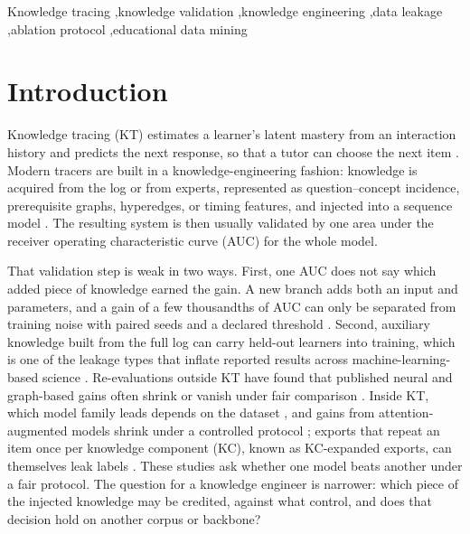 \documentclass[review,12pt]{elsarticle}
\begin{document}
\begin{frontmatter}
\begin{keyword}
Knowledge tracing \sep knowledge validation \sep knowledge engineering
\sep data leakage \sep ablation protocol \sep educational data mining
\end{keyword}

\end{frontmatter}

\section{Introduction}

Knowledge tracing (KT) estimates a learner's latent mastery from an
interaction history and predicts the next response, so that a tutor
can choose the next item \cite{corbett1995bkt}. Modern tracers are built in a
knowledge-engineering fashion: knowledge is acquired from the log or
from experts, represented as question--concept incidence, prerequisite
graphs, hyperedges, or timing features, and injected into a sequence
model \cite{yang2021gikt,nakagawa2019gkt,shen2021lpkt}. The resulting
system is then usually validated by one area under the receiver
operating characteristic curve (AUC) for the whole model.

That validation step is weak in two ways. First, one AUC does not say
which added piece of knowledge earned the gain. A new branch adds both
an input and parameters, and a gain of a few thousandths of AUC can only
be separated from training noise with paired seeds and a declared
threshold \cite{bouthillier2021variance}. Second, auxiliary knowledge built from
the full log can carry held-out learners into training, which is one
of the leakage types that inflate reported results across
machine-learning-based science \cite{kapoor2023leakage}. Re-evaluations
outside KT have found that published neural and graph-based gains often
shrink or vanish under fair comparison
\cite{ferraridacrema2019progress,shehzad2025gnnsbrs}. Inside KT, which
model family leads depends on the dataset \cite{gervet2020deepkt}, and
gains from attention-augmented models shrink under a controlled
protocol \cite{kim2026pktreliability}; exports that repeat an item
once per knowledge component (KC), known as KC-expanded exports, can
themselves leak labels \cite{badran2025labelleak,liu2022pykt}. These
studies ask whether one model beats another under a fair protocol. The
question for a knowledge engineer is narrower: which piece of the
injected knowledge may be credited, against what control, and does that
decision hold on another corpus or backbone?
\end{document}
